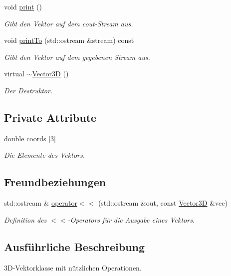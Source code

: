 \begin{DoxyCompactItemize}
void \hyperlink{classVector3D_a37762d009e092a9a9eecb2de03b6f0ec}{print} ()
\begin{DoxyCompactList}\small\item\em Gibt den Vektor auf dem cout-\/\-Stream aus. \end{DoxyCompactList}\item 
void \hyperlink{classVector3D_a93ebaebe8d2f4f15ef1f79f5fe2cb682}{print\-To} (std\-::ostream \&stream) const 
\begin{DoxyCompactList}\small\item\em Gibt den Vektor auf dem gegebenen Stream aus. \end{DoxyCompactList}\item 
virtual \hyperlink{classVector3D_ae4fde5759270bf5bcf615f12f0823a8c}{$\sim$\-Vector3\-D} ()
\begin{DoxyCompactList}\small\item\em Der Destruktor. \end{DoxyCompactList}\end{DoxyCompactItemize}
\subsection*{Private Attribute}
\begin{DoxyCompactItemize}
\item 
double \hyperlink{classVector3D_a1049b9da244f538b5c1f3ac700a776ee}{coords} \mbox{[}3\mbox{]}
\begin{DoxyCompactList}\small\item\em Die Elemente des Vektors. \end{DoxyCompactList}\end{DoxyCompactItemize}
\subsection*{Freundbeziehungen}
\begin{DoxyCompactItemize}
\item 
std\-::ostream \& \hyperlink{classVector3D_a948421d7d2b275c202125839e5d7b843}{operator$<$$<$} (std\-::ostream \&out, const \hyperlink{classVector3D}{Vector3\-D} \&vec)
\begin{DoxyCompactList}\small\item\em Definition des $<$$<$-\/\-Operators für die Ausgabe eines Vektors. \end{DoxyCompactList}\end{DoxyCompactItemize}


\subsection{Ausführliche Beschreibung}
3\-D-\/\-Vektorklasse mit nützlichen Operationen. 

